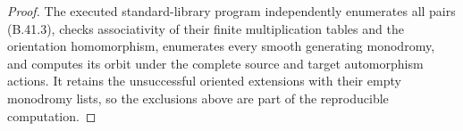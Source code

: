 \begin{proof}
The executed standard-library program
 independently enumerates
all pairs (B.41.3), checks associativity of their finite
multiplication tables and the orientation homomorphism,
enumerates every smooth generating monodromy, and computes
its orbit under the complete source and target automorphism
actions.  It retains the unsuccessful oriented extensions
with their empty monodromy lists, so the exclusions above
are part of the reproducible computation.
\end{proof}
